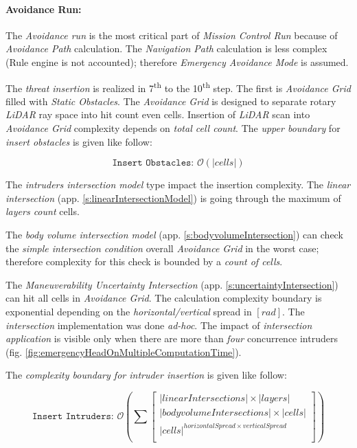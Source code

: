 \paragraph{Avoidance Run:} The \emph{Avoidance run} is the most critical part of \emph{Mission Control Run} because of \emph{Avoidance Path} calculation. The \emph{Navigation Path} calculation is less complex (Rule engine is not accounted); therefore \emph{Emergency Avoidance Mode} is assumed. 

The \emph{threat insertion} is realized in 7\textsuperscript{th} to the  10\textsuperscript{th} step. The first is \emph{Avoidance Grid} filled with \emph{Static Obstacles}. The \emph{Avoidance Grid} is designed to separate rotary  \emph{LiDAR} ray space into hit count even cells. Insertion of \emph{LiDAR} scan into \emph{Avoidance Grid} complexity depends on \emph{total cell count}. The \emph{upper boundary} for \emph{insert obstacles} is given like follow:

\begin{equation*}
    \texttt{Insert Obstacles: } \mathscr{O}(|cells|)
\end{equation*}

\noindent The \emph{intruders intersection model} type impact the insertion complexity. The \emph{linear intersection} (app. \ref{s:linearIntersectionModel}) is going through the maximum of \emph{layers count} cells. 

The \emph{body volume intersection model} (app. \ref{s:bodyvolumeIntersection}) can check the \emph{simple intersection condition} overall \emph{Avoidance Grid} in the worst case; therefore complexity for this check is bounded by a \emph{count of cells}. 

The \emph{Maneuverability Uncertainty Intersection} (app. \ref{s:uncertaintyIntersection}) can hit all cells in \emph{Avoidance Grid}. The calculation complexity boundary is exponential depending on the \emph{horizontal/vertical} spread in $[rad]$. The \emph{intersection} implementation was done \emph{ad-hoc}. The impact of \emph{intersection application} is visible only when there are more than \emph{four} concurrence intruders (fig. \ref{fig:emergencyHeadOnMultipleComputationTime}).

\noindent The \emph{complexity boundary for \emph{intruder insertion}} is given like follow:

\begin{equation*}
    \texttt{Insert Intruders: }
    \mathscr{O}\left(\sum \begin{bmatrix}
        |linear Intersections| \times |layers|\\
        |body volume Intersections| \times  |cells|\\
        |cells|^{horizontal Spread \times vertical Spread}\\
    \end{bmatrix}\right)
\end{equation*}

